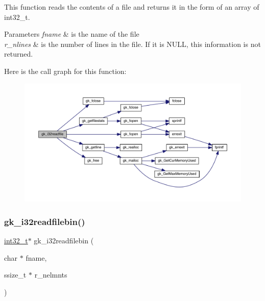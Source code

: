 This function reads the contents of a file and returns it in the form of an array of int32\+\_\+t. 
\begin{DoxyParams}{Parameters}
{\em fname} & is the name of the file \\
\hline
{\em r\+\_\+nlines} & is the number of lines in the file. If it is N\+U\+LL, this information is not returned. \\
\hline
\end{DoxyParams}
Here is the call graph for this function\+:\nopagebreak
\begin{figure}[H]
\begin{center}
\leavevmode
\includegraphics[width=350pt]{a00077_a201c46a9a2bf9c06a917f259d109b7ee_cgraph}
\end{center}
\end{figure}
\mbox{\label{a00077_afbb9b4e2327d298a79924028441a0fdb}} 
\subsubsection{\texorpdfstring{gk\+\_\+i32readfilebin()}{gk\_i32readfilebin()}}
{\footnotesize\ttfamily \hyperlink{a00119_a37994e3b11c72957c6f454c6ec96d43d}{int32\+\_\+t}$\ast$ gk\+\_\+i32readfilebin (\begin{DoxyParamCaption}\item[{char $\ast$}]{fname,  }\item[{ssize\+\_\+t $\ast$}]{r\+\_\+nelmnts }\end{DoxyParamCaption})}

